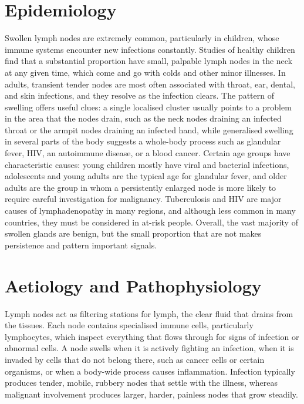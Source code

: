 \section*{Epidemiology}
Swollen lymph nodes are extremely common, particularly in children, whose immune systems encounter new infections constantly. Studies of healthy children find that a substantial proportion have small, palpable lymph nodes in the neck at any given time, which come and go with colds and other minor illnesses. In adults, transient tender nodes are most often associated with throat, ear, dental, and skin infections, and they resolve as the infection clears. The pattern of swelling offers useful clues: a single localised cluster usually points to a problem in the area that the nodes drain, such as the neck nodes draining an infected throat or the armpit nodes draining an infected hand, while generalised swelling in several parts of the body suggests a whole-body process such as glandular fever, HIV, an autoimmune disease, or a blood cancer. Certain age groups have characteristic causes: young children mostly have viral and bacterial infections, adolescents and young adults are the typical age for glandular fever, and older adults are the group in whom a persistently enlarged node is more likely to require careful investigation for malignancy. Tuberculosis and HIV are major causes of lymphadenopathy in many regions, and although less common in many countries, they must be considered in at-risk people. Overall, the vast majority of swollen glands are benign, but the small proportion that are not makes persistence and pattern important signals.

\section*{Aetiology and Pathophysiology}
Lymph nodes act as filtering stations for lymph, the clear fluid that drains from the tissues. Each node contains specialised immune cells, particularly lymphocytes, which inspect everything that flows through for signs of infection or abnormal cells. A node swells when it is actively fighting an infection, when it is invaded by cells that do not belong there, such as cancer cells or certain organisms, or when a body-wide process causes inflammation. Infection typically produces tender, mobile, rubbery nodes that settle with the illness, whereas malignant involvement produces larger, harder, painless nodes that grow steadily.

